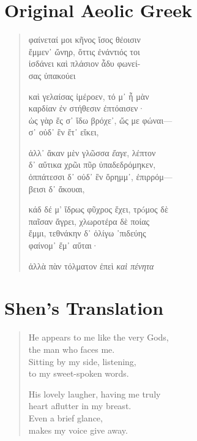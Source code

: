 \begin{multicols}{2}
\section*{Original Aeolic Greek}
\begin{verse}
  φαίνεταί μοι κῆνος ἴσος θέοισιν \\
  ἔμμεν᾽ ὤνηρ, ὄττις ἐνάντιός τοι \\
  ἰσδάνει καὶ πλάσιον ἆδυ φωνεί-  \\
  σας ὐπακούει \\
  \medskip

  καὶ γελαίσας ἰμέροεν, τό μ᾽ ἦ μὰν \\
  καρδίαν ἐν στήθεσιν ἐπτόαισεν· \\
  ὠς γὰρ ἔς σ᾽ ἴδω βρόχε᾽, ὤς με φώναι--- \\
  σ᾽ οὐδ᾽ ἒν ἔτ᾽ εἴκει, \\
  \medskip

  ἀλλ᾽ ἄκαν μὲν γλῶσσα \emph{ἔαγε}, λέπτον \\
  δ᾽ αὔτικα χρῶι πῦρ ὐπαδεδρόμηκεν, \\
  ὀππάτεσσι δ᾽ οὐδ᾽ ἒν ὄρημμ᾽, ἐπιρρόμ--- \\
  βεισι δ᾽ ἄκουαι, \\
  \medskip

  κάδ δέ μ' ἴδρως φῦχρος ἔχει, τρóμος δὲ \\
  παῖσαν ἄγρει, χλωροτέρα δὲ ποίας \\
  ἔμμι, τεθνάκην δ᾽ ὀλίγω ᾽πιδεύης \\
  φαίνομ᾽ ἔμ᾽ αὔται· \\
  \medskip

  ἀλλὰ πὰν τόλματον ἐπεὶ \emph{καὶ πένητα}
\end{verse}
\columnbreak
\section*{Shen's Translation}
\begin{verse}
  He appears to me like the very Gods, \\
  the man who faces me. \\
  Sitting by my side, listening, \\
  to my sweet-spoken words. \\
  \medskip

  His lovely laugher, having me truly \\
  heart aflutter in my breast. \\
  Even a brief glance, \\
  makes my voice give away. \\
  \medskip


\end{verse}
\end{multicols}
